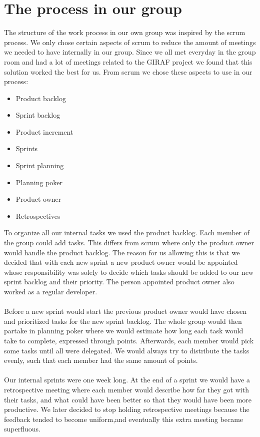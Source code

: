 \section{The process in our group} \label{intro:the-process-in-our-group}
The structure of the work process in our own group was inspired by the scrum process.
We only chose certain aspects of scrum to reduce the amount of meetings we needed to have internally in our group. 
Since we all met everyday in the group room and had a lot of meetings related to the GIRAF project we found that this solution worked the best for us.
From scrum we chose these aspects to use in our process:

 \begin{itemize}
    \item Product backlog
    \item Sprint backlog
    \item Product increment
    \item Sprints
    \item Sprint planning
    \item Planning poker
    \item Product owner
    \item Retrospectives
 \end{itemize}
To organize all our internal tasks we used the product backlog.
Each member of the group could add tasks.
This differs from scrum where only the product owner would handle the product backlog.
The reason for us allowing this is that we decided that with each new sprint a new product owner would be appointed whose responsibility was solely to decide which tasks should be added to our new sprint backlog and their priority.
The person appointed product owner also worked as a regular developer.
\\\\
Before a new sprint would start the previous product owner would have chosen and prioritized tasks for the new sprint backlog.
The whole group would then partake in planning poker where we would estimate how long each task would take to complete, expressed through points.
Afterwards, each member would pick some tasks until all were delegated.
We would always try to distribute the tasks evenly, such that each member had the same amount of points.
\\\\
Our internal sprints were one week long.
At the end of a sprint we would have a retrospective meeting where each member would describe how far they got with their tasks, and what could have been better so that they would have been more productive.
We later decided to stop holding retrospective meetings because the feedback tended to become uniform,and eventually this extra meeting became superfluous.


